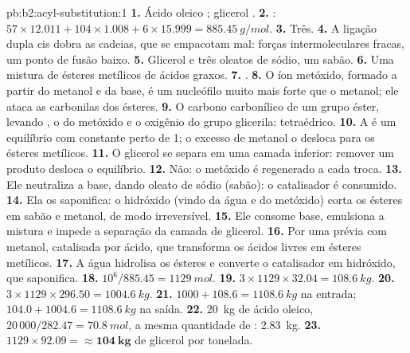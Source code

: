 \begin{solution}{pb:b2:acyl-substitution:1}
\textbf{1.} Ácido oleico ; glicerol .
\textbf{2.} : $57 \times 12.011 + 104 \times 1.008 + 6 \times 15.999 = \qty{885.45}{g/mol}$.
\textbf{3.} Três.
\textbf{4.} A ligação dupla cis dobra as cadeias, que se empacotam mal: forças intermoleculares
fracas, um ponto de fusão baixo.
\textbf{5.} Glicerol e três oleatos de sódio, um sabão.
\textbf{6.} Uma mistura de ésteres metílicos de ácidos graxos.
\textbf{7.} .
\textbf{8.} O íon metóxido, formado a partir do metanol e da base, é um nucleófilo muito mais forte
que o metanol; ele ataca as carbonilas dos ésteres.
\textbf{9.} O carbono carbonílico de um grupo éster, levando , o  do metóxido e o
oxigênio do grupo glicerila: tetraédrico.
\textbf{10.} A  é um equilíbrio com constante perto de 1; o excesso de metanol o
desloca para os ésteres metílicos.
\textbf{11.} O glicerol se separa em uma camada inferior: remover um produto desloca o equilíbrio.
\textbf{12.} Não: o metóxido é regenerado a cada troca.
\textbf{13.} Ele neutraliza a base, dando oleato de sódio (sabão): o catalisador é consumido.
\textbf{14.} Ela os saponifica: o hidróxido (vindo da água e do metóxido) corta os ésteres em sabão e
metanol, de modo irreversível.
\textbf{15.} Ele consome base, emulsiona a mistura e impede a separação da camada de glicerol.
\textbf{16.} Por uma  prévia com metanol, catalisada por ácido, que transforma os ácidos
livres em ésteres metílicos.
\textbf{17.} A água hidrolisa os ésteres e converte o catalisador em hidróxido, que saponifica.
\textbf{18.} $10^6/885.45 = \qty{1129}{mol}$.
\textbf{19.} $3 \times 1129 \times 32.04 = \qty{108.6}{kg}$.
\textbf{20.} $3 \times 1129 \times 296.50 = \qty{1004.6}{kg}$.
\textbf{21.} $1000 + 108.6 = \qty{1108.6}{kg}$ na entrada; $104.0 + 1004.6 = \qty{1108.6}{kg}$ na saída.
\textbf{22.} \qty{20}{kg} de ácido oleico, $20\,000/282.47 = \qty{70.8}{mol}$, a mesma quantidade de :
\qty{2.83}{kg}.
\textbf{23.} $1129 \times 92.09 = \boldsymbol{\approx \qty{104}{kg}}$ de glicerol por tonelada.
\end{solution}
